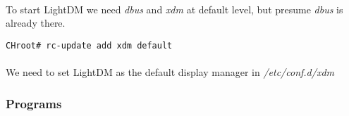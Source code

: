 \documentclass[11pt,a4paper]{article}
\begin{document}
                    \paragraph{} To start LightDM we need \textit{dbus} and \textit{xdm} at default level, but presume \textit{dbus} is already there.

                    \begin{lstlisting}[style=BashInputCHRoot]
 CHroot# rc-update add xdm default
                    \end{lstlisting}

                    \paragraph{} We need to set LightDM as the default display manager in \textit{/etc/conf.d/xdm}

                    

                \newpage
                \subsubsection{Programs}
\end{document}
